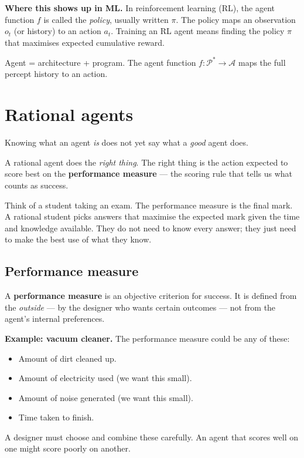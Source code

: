 \documentclass[a4paper,11pt]{article}
\newcommand{\vocab}[1]{\textbf{\color{navy}#1}}
\begin{document}
\textbf{Where this shows up in ML.}
In reinforcement learning (RL), the agent function $f$ is called the
\emph{policy}, usually written $\pi$.
The policy maps an observation $o_t$ (or history) to an action $a_t$.
Training an RL agent means finding the policy $\pi$ that maximises
expected cumulative reward.

\begin{keytake}
Agent = architecture + program.
The agent function $f\colon \mathcal{P}^{*} \to \mathcal{A}$ maps the full
percept history to an action.
\end{keytake}

\section{Rational agents}

Knowing what an agent \emph{is} does not yet say what a \emph{good} agent does.

\begin{intuition}
A rational agent does the \emph{right thing}.
The right thing is the action expected to score best on the
\vocab{performance measure} --- the scoring rule that tells us what counts
as success.
\end{intuition}

\begin{everyday}
Think of a student taking an exam. The performance measure is the final
mark. A rational student picks answers that maximise the expected mark
given the time and knowledge available. They do not need to know every
answer; they just need to make the best use of what they know.
\end{everyday}

\subsection{Performance measure}

A \vocab{performance measure} is an objective criterion for success.
It is defined from the \emph{outside} --- by the designer who wants certain
outcomes --- not from the agent's internal preferences.

\textbf{Example: vacuum cleaner.}
The performance measure could be any of these:
\begin{itemize}
  \item Amount of dirt cleaned up.
  \item Amount of electricity used (we want this small).
  \item Amount of noise generated (we want this small).
  \item Time taken to finish.
\end{itemize}
A designer must choose and combine these carefully.
An agent that scores well on one might score poorly on another.
\end{document}
